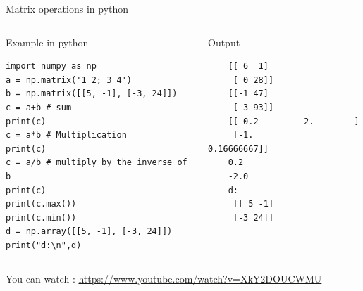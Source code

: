 \documentclass[xcolor=svgnames,t,10pt,allowframebreaks]{beamer}
\begin{document}
\begin{frame}[fragile,label={sec:org23bc246}]{Matrix operations in python}
 \begin{columns}
\begin{column}{0.50\columnwidth}
\begin{block}{Example in python}
\begin{verbatim}
import numpy as np
a = np.matrix('1 2; 3 4')
b = np.matrix([[5, -1], [-3, 24]])
c = a+b # sum
print(c)
c = a*b # Multiplication
print(c)
c = a/b # multiply by the inverse of b
print(c)
print(c.max())
print(c.min())
d = np.array([[5, -1], [-3, 24]])
print("d:\n",d)
\end{verbatim}
\end{block}
\end{column}

\begin{column}{0.45\columnwidth}
\begin{block}{Output}
\begin{verbatim}
    [[ 6  1]
     [ 0 28]]
    [[-1 47]
     [ 3 93]]
    [[ 0.2        -2.        ]
     [-1.          0.16666667]]
    0.2
    -2.0
    d:
     [[ 5 -1]
     [-3 24]]
\end{verbatim}
\end{block}
\end{column}
\end{columns}
\end{frame}

\begin{frame}[standout,label=]{}
You can watch : \url{https://www.youtube.com/watch?v=XkY2DOUCWMU}
\end{frame}
\end{document}
